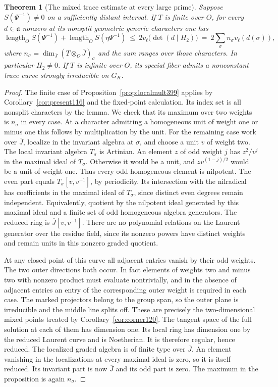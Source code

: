\documentclass[a4paper,11pt]{article}
\newtheorem{theorem}[proposition]{Theorem}
\theoremstyle{definition}
\theoremstyle{remark}
\numberwithin{equation}{section}
\begin{document}
\begin{theorem}[The mixed trace estimate at every large prime]\leavevmode
\label{thm:allhorizontal401}
Suppose \(S(\Psi^{-1})\ne0\) on a sufficiently distant interval.
If \(T\) is finite over \(O\), for every \(d\in\mathfrak a\)
nonzero at its nonsplit geometric generic characters one has
\[
 \operatorname{length}_O S(\Psi^{-1})+
 \operatorname{length}_O S(\eta\Psi^{-1})
 \ \le\ 2v_\ell\bigl(\det(d\mid H_2)\bigr)
 \ =\ 2\sum_{\sigma} n_\sigma v_\ell(d(\sigma)),
\]
where \(n_\sigma=\dim_{\overline J}(T\otimes_O\overline J)_\sigma\)
and the sum ranges over those characters. In particular \(H_2\ne0\).
If \(T\) is infinite over \(O\), its special fiber admits a
nonconstant trace curve strongly irreducible on \(G_K\).
\end{theorem}
\begin{proof}
The finite case of Proposition~\ref{prop:localmult399} applies by
Corollary~\ref{cor:present116} and the fixed-point calculation.
Its index set is all nonsplit characters by the lemma. We check
that its maximum over two weights is \(n_\sigma\) in every case.
At a character admitting a homogeneous unit of weight one or
minus one this follows by multiplication by the unit. For the
remaining case work over \(\overline J\), localize in the
invariant algebra at \(\sigma\), and choose a unit \(v\) of
weight two. The local invariant algebra \(T_\sigma\) is Artinian.
An element \(z\) of odd weight \(j\) has \(z^2/v^j\) in the
maximal ideal of \(T_\sigma\). Otherwise it would be a unit,
and \(zv^{(1-j)/2}\) would be a unit of weight one. Thus every
odd homogeneous element is nilpotent. The even part equals
\(T_\sigma[v,v^{-1}]\), by periodicity. Its intersection
with the nilradical has coefficients in the maximal ideal of
\(T_\sigma\), since distinct even degrees remain independent.
Equivalently, quotient by the nilpotent ideal generated by
this maximal ideal and a finite set of odd homogeneous algebra
generators. The reduced ring is \(\overline J[v,v^{-1}]\).
There are no polynomial relations on the Laurent generator over
the residue field, since its nonzero powers have distinct weights
and remain units in this nonzero graded quotient.

At any closed point of this curve all adjacent entries vanish
by their odd weights. The two outer directions both occur. In
fact elements of weights two and minus two with nonzero product
must evaluate nontrivially, and in the absence of adjacent
entries an entry of the corresponding outer weight is required
in each case. The marked projectors belong to the group span,
so the outer plane is irreducible and the middle line splits off.
These are precisely the two-dimensional mixed points treated by
Corollary~\ref{cor:corner120}. The tangent space of the full
solution at each of them has dimension one. Its local ring has
dimension one by the reduced Laurent curve and is Noetherian.
It is therefore regular, hence reduced. The localized graded
algebra is of finite type over \(\overline J\). An element
vanishing in the localizations at every maximal ideal is zero,
so it is itself reduced. Its invariant part is now \(\overline J\)
and its odd part is zero. The maximum in the proposition is
again \(n_\sigma\).


\end{proof}
\end{document}
